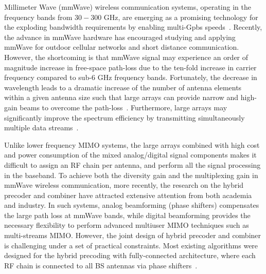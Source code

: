 \documentclass[11pt,draftcls,onecolumn]{IEEEtran}
\begin{document}
Millimeter Wave (mmWave) wireless communication systems, operating in the frequency bands from $30-300$ GHz, are emerging as a promising technology for the exploding bandwidth requirements by enabling multi-Gpbs speeds~\cite{CommBi2011,AccessRap2013,CommRoh2014,ProceddingRan2014,CommHan2015}. Recently, the advance in mmWave hardware has encouraged studying and applying mmWave for outdoor cellular networks and short distance communication. However, the shortcoming is that mmWave signal may experience an order of magnitude increase in free-space path-loss due to the ten-fold increase in carrier frequency compared to sub-6 GHz frequency bands. Fortunately, the decrease in wavelength leads to a dramatic increase of the number of antenna elements within a given antenna size such that large arrays can provide narrow and high-gain beams to overcome the path-loss~\cite{OnlineYong2010,TVTForenza2007,JSACXu2002,TNSingh2011,MLChang2012,ISSCCHong2015,OnlineMat2011,Standard802.11ad}. Furthermore, large arrays may significantly improve the spectrum efficiency by transmitting simultaneously multiple data streams~\cite{CLMolisch2004,JSACWang2009,TWCXiao2015,TAPHaneda2013,TSPZhang2005}.

Unlike lower frequency MIMO systems, the large arrays combined with high cost and power consumption of the mixed analog/digital signal components makes it difficult to assign an RF chain per antenna, and perform all the signal processing in the baseband. To achieve both the diversity gain and the multiplexing gain in mmWave wireless communication, more recently, the research on the hybrid precoder and combiner have attracted extensive attention from both academia and industry. In such systems, analog beamforming (phase shifters) compensates the large path loss at mmWave bands, while digital beamforming provides the necessary flexibility to perform advanced multiuser MIMO techniques such as multi-streams MIMO. However, the joint design of hybrid precoder and combiner is challenging under a set of practical constraints. Most existing algorithms were designed for the hybrid precoding with fully-connected architecture, where each RF chain is connected to all BS antennas via phase shifters~\cite{TWCAyach2014,TVTKim2015,JSTSPAlk2014,CLLiang2014,TWCAlk2015,TSPLee2015,TVTZhu2016}.
\end{document}
